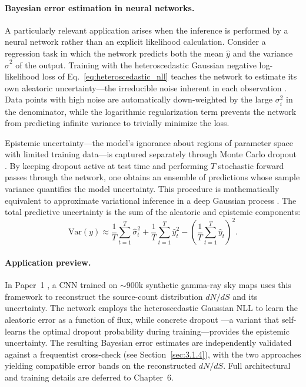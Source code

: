 \paragraph{Bayesian error estimation in neural networks.}

A particularly relevant application arises when the inference is performed by a neural network rather than an explicit likelihood calculation. Consider a regression task in which the network predicts both the mean $\hat{y}$ and the variance $\hat{\sigma}^2$ of the output. Training with the heteroscedastic Gaussian negative log-likelihood loss of Eq.~\eqref{eq:heteroscedastic_nll} teaches the network to estimate its own aleatoric uncertainty---the irreducible noise inherent in each observation \cite{Kendall:2017}. Data points with high noise are automatically down-weighted by the large $\sigma_i^2$ in the denominator, while the logarithmic regularization term prevents the network from predicting infinite variance to trivially minimize the loss.

Epistemic uncertainty---the model's ignorance about regions of parameter space with limited training data---is captured separately through Monte Carlo dropout \cite{Gal:2016}. By keeping dropout active at test time and performing $T$ stochastic forward passes through the network, one obtains an ensemble of predictions whose sample variance quantifies the model uncertainty. This procedure is mathematically equivalent to approximate variational inference in a deep Gaussian process \cite{Gal:2016}. The total predictive uncertainty is the sum of the aleatoric and epistemic components:
\begin{equation}
\mathrm{Var}(y) \approx \frac{1}{T}\sum_{t=1}^{T} \hat{\sigma}_t^2 + \frac{1}{T}\sum_{t=1}^{T} \hat{y}_t^2 - \left(\frac{1}{T}\sum_{t=1}^{T}\hat{y}_t\right)^2.
\label{eq:total_variance}
\end{equation}

\paragraph{Application preview.}

In Paper~1 \cite{Amerio:2023dns}, a CNN trained on $\sim$900k synthetic gamma-ray sky maps uses this framework to reconstruct the source-count distribution $dN/dS$ and its uncertainty. The network employs the heteroscedastic Gaussian NLL to learn the aleatoric error as a function of flux, while concrete dropout \cite{Gal:2017}---a variant that self-learns the optimal dropout probability during training---provides the epistemic uncertainty. The resulting Bayesian error estimates are independently validated against a frequentist cross-check (see Section~\ref{sec:3.1.4}), with the two approaches yielding compatible error bands on the reconstructed $dN/dS$. Full architectural and training details are deferred to Chapter~6.


